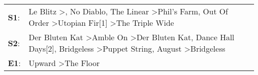 \begin{supertabular}{p{0.03\textwidth}p{0.92\textwidth}}
 \textbf{S1}:  &            Le Blitz\textsuperscript{} \textgreater {}\textsuperscript{}, \enspace No Diablo\textsuperscript{}, \enspace The Linear\textsuperscript{} \textgreater \enspace Phil's Farm\textsuperscript{}, \enspace Out Of Order\textsuperscript{} \textgreater \enspace Utopian Fir[1]\textsuperscript{} \textgreater \enspace The Triple Wide\textsuperscript{}  \enspace  \\
 \textbf{S2}:  &  Der Bluten Kat\textsuperscript{} \textgreater \enspace Amble On\textsuperscript{} \textgreater \enspace Der Bluten Kat\textsuperscript{}, \enspace Dance Hall Days[2]\textsuperscript{}, \enspace Bridgeless\textsuperscript{} \textgreater \enspace Puppet String\textsuperscript{}, \enspace August\textsuperscript{} \textgreater \enspace Bridgeless\textsuperscript{}  \enspace  \\
 \textbf{E1}:  &                                                                                                                                                                                                                                                                                                  Upward\textsuperscript{} \textgreater \enspace The Floor\textsuperscript{}  \enspace  \\
\end{supertabular}
